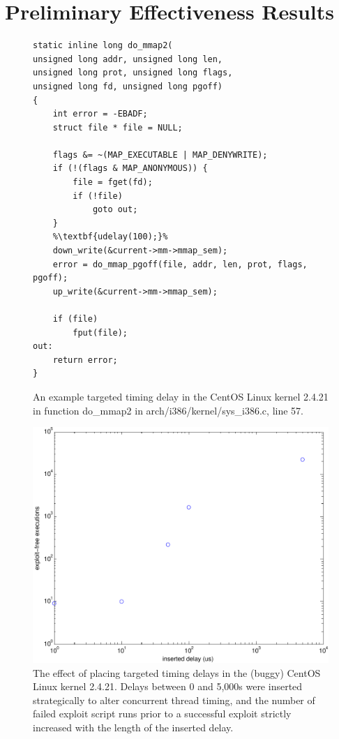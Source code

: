 \documentclass[letterpaper,twocolumn,10pt]{article}
\begin{document}
\section{Preliminary Effectiveness Results}
\begin{figure}
\begin{lstlisting}[firstnumber=43]
static inline long do_mmap2(
unsigned long addr, unsigned long len,
unsigned long prot, unsigned long flags,
unsigned long fd, unsigned long pgoff)
{
	int error = -EBADF;
	struct file * file = NULL;

	flags &= ~(MAP_EXECUTABLE | MAP_DENYWRITE);
	if (!(flags & MAP_ANONYMOUS)) {
		file = fget(fd);
		if (!file)
			goto out;
	}
	%\textbf{udelay(100);}%
	down_write(&current->mm->mmap_sem);
	error = do_mmap_pgoff(file, addr, len, prot, flags, pgoff);
	up_write(&current->mm->mmap_sem);

	if (file)
		fput(file);
out:
	return error;
}
\end{lstlisting}
\caption{An example targeted timing delay in the CentOS Linux kernel 2.4.21 in function do\_mmap2 in arch/i386/kernel/sys\_i386.c, line 57.}
\label{fig_mmapcode}
\end{figure}
\begin{figure}
\centering
\includegraphics[width=\columnwidth]{prelimgraph}
\caption{The effect of placing targeted timing delays in the (buggy) CentOS Linux kernel 2.4.21.  Delays between 0 and 5,000{\textmu}s were inserted strategically to alter concurrent thread timing, and the number of failed exploit script runs prior to a successful exploit strictly increased with the length of the inserted delay.}
\label{fig_prelimgraph}
\end{figure}
\end{document}
